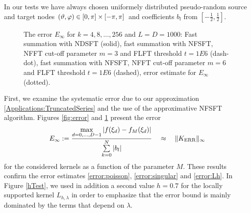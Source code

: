 In our tests we have always chosen uniformely distributed pseudo-random 
source and target nodes 
$\left(\vartheta,\varphi\right) \in [0,\pi] \times [-\pi,\pi]$ and 
coefficients $b_l$ from $\left[-\frac{1}{2},\frac{1}{2}\right]$.

\begin{figure}[tb]
  \centering
  \hfill
  \caption{The error $E_{\infty}$ for $k = 4,8,\ldots,256$ and $L = D = 1000$: 
  Fast summation with NDSFT (solid), fast summation with NFSFT, 
  NFFT cut-off parameter $m = 3$ and FLFT threshold $t = 1E6$ (dash-dot), 
  fast summation with NFSFT, NFFT cut-off parameter $m = 6$ and FLFT threshold 
  $t = 1E6$ (dashed), error estimate for $E_{\infty}$ (dotted).}
  \label{fig:error2}
\end{figure}

First, we examine the systematic error due to our approximation 
\eqref{Applications:TruncatedSeries} and the use of the 
approximative NFSFT algorithm. Figures \ref{fig:error} and
\ref{fig:error2} present
the error
\[
  E_{\infty}:=
  \frac{\max\limits_{d=0,\ldots,D-1}\left|f{\hspace{-0.4ex}}\left(\xi_{d}\right)-
  f_{M}{\hspace{-0.4ex}}\left(\xi_{d}\right)\right|}{\sum\limits_{k=0}^N 
  |b_l|} \quad \approx \quad \|K_{\text{ERR}}\|_{\infty}
\]
for the considered kernels as a function of the parameter $M$.
These results confirm the error estimates \eqref{error:poisson},
\eqref{error:singular} and \eqref{error:Lh}. 
In Figure \ref{hTest},
we used in addition a second value $h=0.7$ for the locally supported 
kernel $L_{h,\lambda}$ in order to emphasize that the error 
bound is mainly dominated by the terms that depend on $\lambda$.

